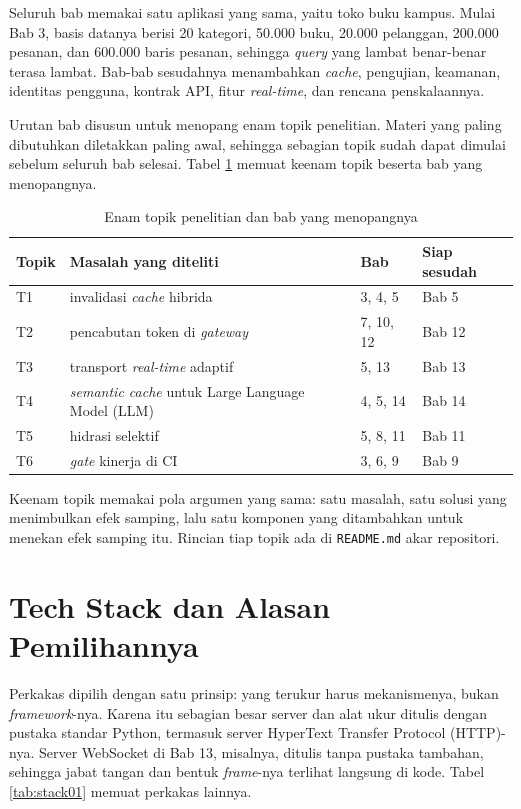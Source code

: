 Seluruh bab memakai satu aplikasi yang sama, yaitu toko buku kampus.
Mulai Bab 3, basis datanya berisi 20 kategori, 50.000 buku, 20.000 pelanggan,
200.000 pesanan, dan 600.000 baris pesanan, sehingga \textit{query} yang
lambat benar-benar terasa lambat. Bab-bab sesudahnya menambahkan
\textit{cache}, pengujian, keamanan, identitas pengguna, kontrak API, fitur
\textit{real-time}, dan rencana penskalaannya.

Urutan bab disusun untuk menopang enam topik penelitian. Materi yang paling
dibutuhkan diletakkan paling awal, sehingga sebagian topik sudah dapat
dimulai sebelum seluruh bab selesai. Tabel \ref{tab:topik01} memuat keenam
topik beserta bab yang menopangnya.

\begin{table}[!htb]
  \centering
  \caption{Enam topik penelitian dan bab yang menopangnya}
  \label{tab:topik01}
  \begin{tabularx}{\textwidth}{lXll}
    \hline
    \textbf{Topik} & \textbf{Masalah yang diteliti} & \textbf{Bab} & \textbf{Siap sesudah} \\
    \hline
    T1 & invalidasi \textit{cache} hibrida & 3, 4, 5 & Bab 5 \\
    \hline
    T2 & pencabutan token di \textit{gateway} & 7, 10, 12 & Bab 12 \\
    \hline
    T3 & transport \textit{real-time} adaptif & 5, 13 & Bab 13 \\
    \hline
    T4 & \textit{semantic cache} untuk Large Language Model (LLM) & 4, 5, 14 & Bab 14 \\
    \hline
    T5 & hidrasi selektif & 5, 8, 11 & Bab 11 \\
    \hline
    T6 & \textit{gate} kinerja di CI & 3, 6, 9 & Bab 9 \\
    \hline
  \end{tabularx}
\end{table}

Keenam topik memakai pola argumen yang sama: satu masalah, satu solusi yang
menimbulkan efek samping, lalu satu komponen yang ditambahkan untuk menekan
efek samping itu. Rincian tiap topik ada di \texttt{README.md} akar
repositori.

\section{Tech Stack dan Alasan Pemilihannya}

Perkakas dipilih dengan satu prinsip: yang terukur harus mekanismenya, bukan
\textit{framework}-nya. Karena itu sebagian besar server dan alat ukur ditulis
dengan pustaka standar Python, termasuk server HyperText Transfer Protocol
(HTTP)-nya. Server WebSocket di Bab 13, misalnya, ditulis
tanpa pustaka tambahan, sehingga jabat tangan dan bentuk \textit{frame}-nya
terlihat langsung di kode. Tabel \ref{tab:stack01} memuat perkakas lainnya.

